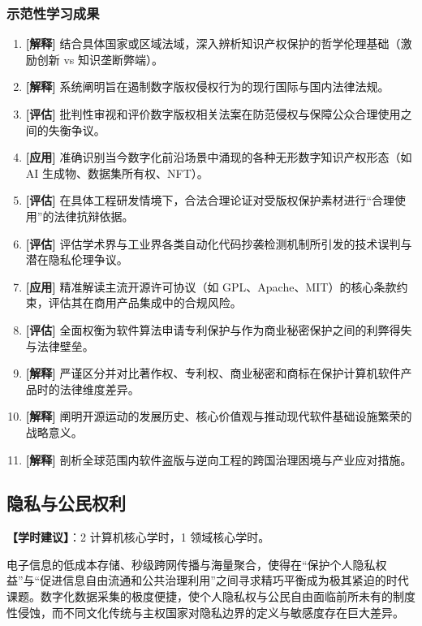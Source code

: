 \subsubsection{示范性学习成果}
\begin{enumerate}
    \item \textbf{[解释]} 结合具体国家或区域法域，深入辨析知识产权保护的哲学伦理基础（激励创新 vs 知识垄断弊端）。
    \item \textbf{[解释]} 系统阐明旨在遏制数字版权侵权行为的现行国际与国内法律法规。
    \item \textbf{[评估]} 批判性审视和评价数字版权相关法案在防范侵权与保障公众合理使用之间的失衡争议。
    \item \textbf{[应用]} 准确识别当今数字化前沿场景中涌现的各种无形数字知识产权形态（如 AI 生成物、数据集所有权、NFT）。
    \item \textbf{[评估]} 在具体工程研发情境下，合法合理论证对受版权保护素材进行“合理使用”的法律抗辩依据。
    \item \textbf{[评估]} 评估学术界与工业界各类自动化代码抄袭检测机制所引发的技术误判与潜在隐私伦理争议。
    \item \textbf{[应用]} 精准解读主流开源许可协议（如 GPL、Apache、MIT）的核心条款约束，评估其在商用产品集成中的合规风险。
    \item \textbf{[评估]} 全面权衡为软件算法申请专利保护与作为商业秘密保护之间的利弊得失与法律壁垒。
    \item \textbf{[解释]} 严谨区分并对比著作权、专利权、商业秘密和商标在保护计算机软件产品时的法律维度差异。
    \item \textbf{[解释]} 阐明开源运动的发展历史、核心价值观与推动现代软件基础设施繁荣的战略意义。
    \item \textbf{[解释]} 剖析全球范围内软件盗版与逆向工程的跨国治理困境与产业应对措施。
\end{enumerate}

\subsection{隐私与公民权利}
\textbf{【学时建议】}：2 计算机核心学时，1 领域核心学时。

电子信息的低成本存储、秒级跨网传播与海量聚合，使得在“保护个人隐私权益”与“促进信息自由流通和公共治理利用”之间寻求精巧平衡成为极其紧迫的时代课题。数字化数据采集的极度便捷，使个人隐私权与公民自由面临前所未有的制度性侵蚀，而不同文化传统与主权国家对隐私边界的定义与敏感度存在巨大差异。

